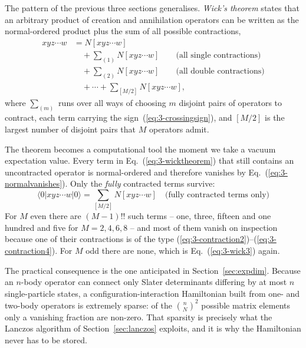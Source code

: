 The pattern of the previous three sections generalises.  \emph{Wick's
theorem} states that an arbitrary product of creation and annihilation
operators can be written as the normal-ordered product plus the sum of all
possible contractions,
\begin{align}
  xyz\cdots w
   &= N\left[xyz\cdots w\right] \nonumber\\
   &\quad + \sum_{(1)} N\left[xyz\cdots w\right]
     \qquad\text{(all single contractions)}\nonumber\\
   &\quad + \sum_{(2)} N\left[xyz\cdots w\right]
     \qquad\text{(all double contractions)}\nonumber\\
   &\quad + \cdots
     + \sum_{[M/2]} N\left[xyz\cdots w\right] ,
  \label{eq:3-wicktheorem}
\end{align}
where $\sum_{(m)}$ runs over all ways of choosing $m$ disjoint pairs of
operators to contract, each term carrying the sign~(\ref{eq:3-crossingsign}),
and $[M/2]$ is the largest number of disjoint pairs that $M$ operators admit.

The theorem becomes a computational tool the moment we take a vacuum
expectation value.  Every term in Eq.~(\ref{eq:3-wicktheorem}) that still
contains an uncontracted operator is normal-ordered and therefore vanishes by
Eq.~(\ref{eq:3-normalvanishes}).  Only the \emph{fully} contracted terms
survive:
\begin{equation}
  \boxed{\;
  \langle 0\vert xyz\cdots w\vert 0\rangle
   = \sum_{[M/2]} N\left[xyz\cdots w\right]
   \quad\text{(fully contracted terms only)} \;}
  \label{eq:3-wickvev}
\end{equation}
For $M$ even there are $(M-1)!!$ such terms -- one, three, fifteen and
one hundred and five for $M=2,4,6,8$ -- and most of them vanish on inspection
because one of their contractions is of the type
(\ref{eq:3-contraction2})--(\ref{eq:3-contraction4}).  For $M$ odd there are
none, which is Eq.~(\ref{eq:3-wick3}) again.

The practical consequence is the one anticipated in
Section~\ref{sec:expdim}.  Because an $n$-body operator can connect only
Slater determinants differing by at most $n$ single-particle states, a
configuration-interaction Hamiltonian built from one- and two-body operators
is extremely sparse: of the $\binom{n}{N}^2$ possible matrix elements only a
vanishing fraction are non-zero.  That sparsity is precisely what the Lanczos
algorithm of Section~\ref{sec:lanczos} exploits, and it is why the Hamiltonian
never has to be stored.

